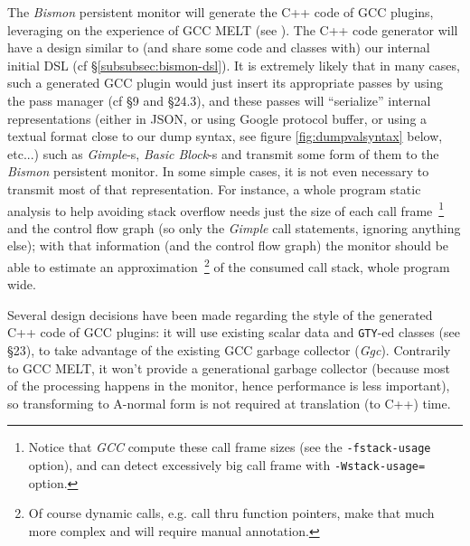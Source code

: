 The \emph{Bismon} persistent monitor will generate the C++ code of GCC
plugins, leveraging on the experience of GCC MELT (see
\cite{Starynkevitch-DSL2011,Starynkevitch2007Multistage,Starynkevitch-GCCMELTweb}). The
C++ code generator will have a design similar to (and share some code
and classes with) our internal initial DSL (cf
§\ref{subsubsec:bismon-dsl}). It is extremely likely that in many
cases, such a generated GCC plugin would just insert its appropriate
passes by using the pass manager (cf \cite{gcc-internals} §9 and
§24.3), and these passes will ``serialize'' internal representations
(either in JSON, or using Google protocol buffer, or using a textual
format close to our dump syntax, see figure \ref{fig:dumpvalsyntax}
below, etc...)  such as \emph{Gimple}-s, \emph{Basic Block}-s and
transmit some form of them to the \emph{Bismon} persistent monitor. In
some simple cases, it is not even necessary to transmit most of that
representation. For instance, a whole program static analysis to help
avoiding stack overflow needs just the size of each call
frame~\footnote{Notice that \emph{GCC} compute these call frame sizes
  (see the \texttt{-fstack-usage} option), and can detect excessively
  big call frame with \texttt{-Wstack-usage=} option.} and the control
flow graph (so only the \emph{Gimple} call statements, ignoring
anything else); with that information (and the control flow graph)
the monitor should be able to estimate an approximation~\footnote{Of
  course dynamic calls, e.g. call thru function pointers, make that
  much more complex and will require manual annotation.} of the
consumed call stack, whole program wide.

Several design decisions have been made regarding the style of the
generated C++ code of GCC plugins: it will use existing scalar data
and \texttt{GTY}-ed classes (see \cite{gcc-internals} §23), to take
advantage of the existing GCC garbage collector
(\emph{Ggc}). Contrarily to GCC MELT, it won't provide a generational
garbage collector (because most of the processing happens in the
monitor, hence performance is less important), so transforming to
A-normal form is not required at translation (to C++) time.



